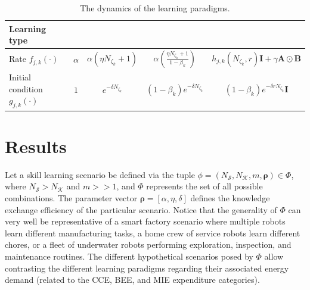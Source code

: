 \documentclass[12pt]{article}
\begin{document}
\begin{table}[!ht]
\caption{The dynamics of the learning paradigms.\label{tab:learning_paradigms_expressions}}
\begin{center}
\begin{adjustbox}{width=\textwidth}
\begin{tabular}{|l||*{4}{c|}}\hline
	Learning type
	&\makebox[3em]{IsL}&\makebox[3em]{IL}&\makebox[3em]{TIL}
	&\makebox[3em]{CL}\\\hline\hline
	Rate $f_{j,k}\left(\cdot \right)$  &$ \alpha$ & $ \alpha\left(\eta N_{\zeta_k} + 1 \right)$ & $\alpha \left( \frac{\eta N_{\zeta_k} + 1}{1 - \beta_k} \right)$ & $h_{j,k}\left(N_{\zeta_k},r\right) \bm{I} + \gamma \bm{A} \odot \bm{B}$ \\\hline
	Initial condition $g_{j,k}\left(\cdot \right)$ &$1$ & $e^{-\delta N_{\zeta_k}}$ & $(1-\beta_k) e^{-\delta N_{\zeta_k}}$ & $(1-\beta_k) e^{-\delta r N_{\zeta_k}} \bm{I}$ \\\hline
\end{tabular}
\end{adjustbox}
\end{center}	
\end{table}
\section*{Results}\label{sec_use_case}
Let a skill learning scenario be defined via the tuple $\phi = \left(N_\mathcal{S}, N_\mathcal{K}, m, \bm{\rho} \right) \in \Phi$, where $N_\mathcal{S} > N_\mathcal{K}$ and $m >> 1$, and $\Phi$ represents the set of all possible combinations. The parameter vector $\bm{\rho} = \left[\alpha, \eta, \delta\right]$ defines the knowledge exchange efficiency of the particular scenario. Notice that the generality of $\Phi$ can very well be representative of a smart factory scenario where multiple robots learn different manufacturing tasks, a home crew of service robots learn different chores, or a fleet of underwater robots performing exploration, inspection, and maintenance routines. The different hypothetical scenarios posed by $\Phi$ allow contrasting the different learning paradigms regarding their associated energy demand (related to the CCE, BEE, and MIE expenditure categories).
	
\end{document}
